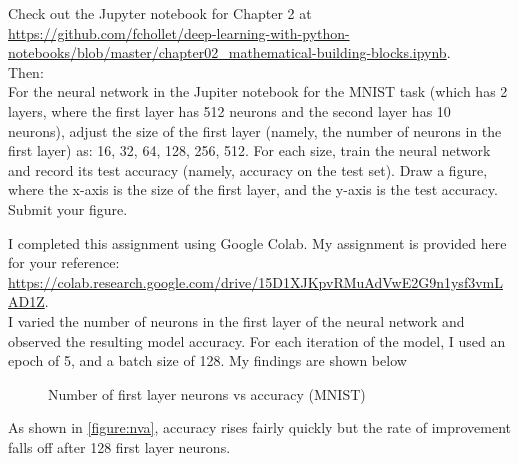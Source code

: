 \documentclass[11pt]{article}
\begin{document}
\makeAssignmentTitle

\begin{homeworkProblem}
    Check out the Jupyter notebook for Chapter 2 at \url{https://github.com/fchollet/deep-learning-with-python-notebooks/blob/master/chapter02_mathematical-building-blocks.ipynb}. \\

    Then: \\

    For the neural network in the Jupiter notebook for the MNIST task (which has 2 layers, where the first layer has
    512 neurons and the second layer has 10 neurons), adjust the size of the first layer (namely, the number of neurons
    in the first layer) as: 16, 32, 64, 128, 256, 512. For each size, train the neural network and record its test
    accuracy (namely, accuracy on the test set). Draw a figure, where the x-axis is the size of the first layer, and the
    y-axis is the test accuracy. Submit your figure. \\

    \solution

    I completed this assignment using Google Colab. My assignment is provided here for your reference: \url{https://colab.research.google.com/drive/15D1XJKpvRMuAdVwE2G9n1ysf3vmLAD1Z}. \\

    I varied the number of neurons in the first layer of the neural network and observed the resulting model accuracy. For each iteration of the model, I used an epoch of 5, and a batch size of 128. My findings are shown below

    \begin{figure}[h!]
        \vspace{0.5\baselineskip}
        \centering
        \vspace{-0.1cm}
        \caption{Number of first layer neurons vs accuracy (MNIST)}
        \label{figure:nva}
    \end{figure}

    As shown in \autoref{figure:nva}, accuracy rises fairly quickly but the rate of improvement falls off after 128 first layer neurons.
\end{homeworkProblem}
\end{document}
